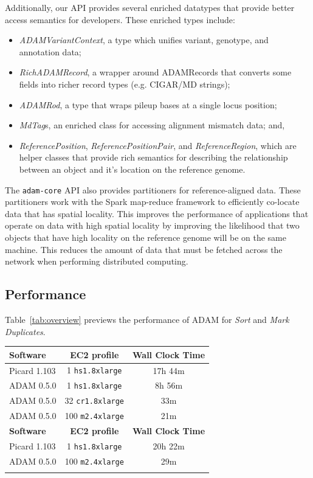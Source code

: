 \documentclass{bioinfo}
\begin{document}
Additionally, our API provides several enriched datatypes that provide better access semantics for developers. These enriched types include:

\begin{itemize}
\item \textit{ADAMVariantContext}, a type which unifies variant, genotype, and annotation data;
\item \textit{RichADAMRecord}, a wrapper around ADAMRecords that converts some fields into richer record types (e.g. CIGAR/MD strings);
\item \textit{ADAMRod}, a type that wraps pileup bases at a single locus position;
\item \textit{MdTag}s, an enriched class for accessing alignment mismatch data; and,
\item \textit{ReferencePosition}, \textit{ReferencePositionPair}, and \textit{ReferenceRegion}, which are helper classes that provide rich semantics for describing the relationship
between an object and it's location on the reference genome.
\end{itemize}

The \texttt{adam-core} API also provides partitioners for reference-aligned data. These partitioners work with the Spark map-reduce framework to efficiently co-locate data that
has spatial locality. This improves the performance of applications that operate on data with high spatial locality by improving the likelihood that two objects that have high
locality on the reference genome will be on the same machine. This reduces the amount of data that must be fetched across the network when performing distributed computing.

\subsection{Performance}
\label{sec:performance}

Table~\ref{tab:overview} previews the performance of ADAM for \textit{Sort} and \textit{Mark Duplicates}.

\begin{table}[h]
{\begin{tabular}{ l c c }
\toprule
\bf Software & \bf EC2 profile & \bf Wall Clock Time \\
\midrule
Picard 1.103 & 1 \texttt{hs1.8xlarge} & 17h 44m \\
ADAM 0.5.0 & 1 \texttt{hs1.8xlarge} & 8h 56m \\
ADAM 0.5.0 & 32 \texttt{cr1.8xlarge} & 33m \\
ADAM 0.5.0 & 100 \texttt{m2.4xlarge} & 21m \\ 
\midrule
\bf Software & \bf EC2 profile & \bf Wall Clock Time \\
\midrule
Picard 1.103 & 1 \texttt{hs1.8xlarge} & 20h 22m \\
ADAM 0.5.0 & 100 \texttt{m2.4xlarge} & 29m \\
\botrule
\end{tabular}}{}
\end{table}
\end{document}
